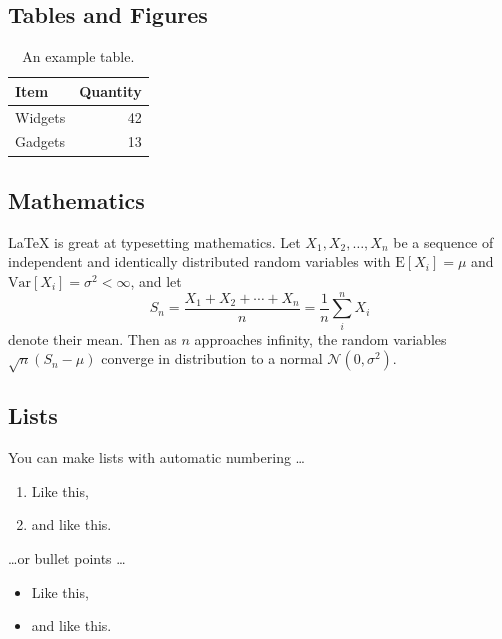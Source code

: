 \documentclass[12pt]{article}
\begin{document}

\subsection{Tables and Figures}

\begin{table}
\centering
\begin{tabular}{l|r}
Item & Quantity \\\hline
Widgets & 42 \\
Gadgets & 13
\end{tabular}
\caption{\label{tab:widgets}An example table.}
\end{table}

\subsection{Mathematics}

\LaTeX{} is great at typesetting mathematics. Let $X_1, X_2, \ldots, X_n$ be a sequence of independent and identically distributed random variables with $\text{E}[X_i] = \mu$ and $\text{Var}[X_i] = \sigma^2 < \infty$, and let
$$S_n = \frac{X_1 + X_2 + \cdots + X_n}{n}
      = \frac{1}{n}\sum_{i}^{n} X_i$$
denote their mean. Then as $n$ approaches infinity, the random variables $\sqrt{n}(S_n - \mu)$ converge in distribution to a normal $\mathcal{N}(0, \sigma^2)$.

\subsection{Lists}

You can make lists with automatic numbering \dots

\begin{enumerate}
\item Like this,
\item and like this.
\end{enumerate}
\dots or bullet points \dots
\begin{itemize}
\item Like this,
\item and like this.
\end{itemize}
\end{document}
